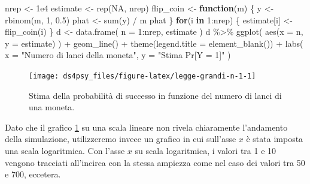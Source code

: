 \documentclass[
  11pt,
]{krantz}
\makeatletter
\newenvironment{Shaded}{\begin{snugshade}}{\end{snugshade}}
\newcommand{\AttributeTok}[1]{\textcolor[rgb]{0.61,0.61,0.61}{#1}}
\newcommand{\ConstantTok}[1]{\textcolor[rgb]{0,0,0}{#1}}
\newcommand{\ControlFlowTok}[1]{\textcolor[rgb]{0.27,0.27,0.27}{\textbf{#1}}}
\newcommand{\DecValTok}[1]{\textcolor[rgb]{0.06,0.06,0.06}{#1}}
\newcommand{\FloatTok}[1]{\textcolor[rgb]{0.06,0.06,0.06}{#1}}
\newcommand{\FunctionTok}[1]{\textcolor[rgb]{0,0,0}{#1}}
\newcommand{\NormalTok}[1]{#1}
\newcommand{\OtherTok}[1]{\textcolor[rgb]{0.37,0.37,0.37}{#1}}
\newcommand{\SpecialCharTok}[1]{\textcolor[rgb]{0,0,0}{#1}}
\newcommand{\StringTok}[1]{\textcolor[rgb]{0.5,0.5,0.5}{#1}}
\newenvironment{kframe}{%
\medskip{}
\setlength{\fboxsep}{.8em}
 \def\at@end@of@kframe{}%
 \ifinner\ifhmode%
  \def\at@end@of@kframe{\end{minipage}}%
  \begin{minipage}{\columnwidth}%
 \fi\fi%
 \def\FrameCommand##1{\hskip\@totalleftmargin \hskip-\fboxsep
 \colorbox{shadecolor}{##1}\hskip-\fboxsep
     \hskip-\linewidth \hskip-\@totalleftmargin \hskip\columnwidth}%
 \MakeFramed {\advance\hsize-\width
   \@totalleftmargin\z@ \linewidth\hsize
   \@setminipage}}%
 {\par\unskip\endMakeFramed%
 \at@end@of@kframe}
\renewenvironment{Shaded}{\begin{kframe}}{\end{kframe}}
\theoremstyle{definition}
\theoremstyle{definition}
\theoremstyle{definition}
\theoremstyle{definition}
\theoremstyle{remark}
\makeatother
\begin{document}
\begin{Shaded}
\begin{Highlighting}[]
\NormalTok{nrep }\OtherTok{\textless{}{-}} \FloatTok{1e4}
\NormalTok{estimate }\OtherTok{\textless{}{-}} \FunctionTok{rep}\NormalTok{(}\ConstantTok{NA}\NormalTok{, nrep)}
\NormalTok{flip\_coin }\OtherTok{\textless{}{-}} \ControlFlowTok{function}\NormalTok{(m) \{}
\NormalTok{  y }\OtherTok{\textless{}{-}} \FunctionTok{rbinom}\NormalTok{(m, }\DecValTok{1}\NormalTok{, }\FloatTok{0.5}\NormalTok{)}
\NormalTok{  phat }\OtherTok{\textless{}{-}} \FunctionTok{sum}\NormalTok{(y) }\SpecialCharTok{/}\NormalTok{ m}
\NormalTok{  phat}
\NormalTok{\}}
\ControlFlowTok{for}\NormalTok{(i }\ControlFlowTok{in} \DecValTok{1}\SpecialCharTok{:}\NormalTok{nrep) \{}
\NormalTok{  estimate[i] }\OtherTok{\textless{}{-}} \FunctionTok{flip\_coin}\NormalTok{(i)}
\NormalTok{\}}
\NormalTok{d }\OtherTok{\textless{}{-}} \FunctionTok{data.frame}\NormalTok{(}
  \AttributeTok{n =} \DecValTok{1}\SpecialCharTok{:}\NormalTok{nrep, }
\NormalTok{  estimate}
\NormalTok{)}
\NormalTok{d }\SpecialCharTok{\%\textgreater{}\%} 
  \FunctionTok{ggplot}\NormalTok{(}
    \FunctionTok{aes}\NormalTok{(}\AttributeTok{x =}\NormalTok{ n, }\AttributeTok{y =}\NormalTok{ estimate)}
\NormalTok{  ) }\SpecialCharTok{+}
  \FunctionTok{geom\_line}\NormalTok{() }\SpecialCharTok{+}
  \FunctionTok{theme}\NormalTok{(}\AttributeTok{legend.title =} \FunctionTok{element\_blank}\NormalTok{()) }\SpecialCharTok{+}
  \FunctionTok{labs}\NormalTok{(}
    \AttributeTok{x =} \StringTok{"Numero di lanci della moneta"}\NormalTok{, }
    \AttributeTok{y =} \StringTok{"Stima Pr[Y = 1]"}
\NormalTok{)}
\end{Highlighting}
\end{Shaded}

\begin{figure}[h]

{\centering \texttt{[image: ds4psy\_files/figure-latex/legge-grandi-n-1-1]} 

}

\caption{Stima della probabilità di successo in funzione del numero di lanci di una moneta.}\label{fig:legge-grandi-n-1}
\end{figure}

Dato che il grafico \ref{fig:legge-grandi-n-1} su una scala lineare non rivela chiaramente l'andamento della simulazione, utilizzeremo invece un grafico in cui sull'asse \(x\) è stata imposta una scala logaritmica. Con l'asse \(x\) su scala logaritmica, i valori tra 1 e 10 vengono tracciati all'incirca con la stessa ampiezza come nel caso dei valori tra 50 e 700, eccetera.
\end{document}
